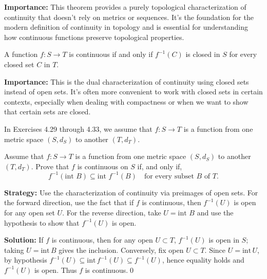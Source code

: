 \noindent\textbf{Importance:} This theorem provides a purely topological characterization of continuity that doesn't rely on metrics or sequences. It's the foundation for the modern definition of continuity in topology and is essential for understanding how continuous functions preserve topological properties.



\begin{theorem}
A function $f: S \to T$ is continuous if and only if $f^{-1}(C)$ is closed in $S$ for every closed set $C$ in $T$.
\end{theorem}

\noindent\textbf{Importance:} This is the dual characterization of continuity using closed sets instead of open sets. It's often more convenient to work with closed sets in certain contexts, especially when dealing with compactness or when we want to show that certain sets are closed.



In Exercises 4.29 through 4.33, we assume that $f:S\to T$ is a function from one metric space $(S,d_S)$ to another $(T,d_T)$.



\begin{problembox}
\begin{problemstatement}
Assume that $f : S \rightarrow T$ is a function from one metric space $(S, d_S)$ to another $(T, d_T)$. Prove that $f$ is continuous on $S$ if, and only if,
\[ f^{-1}(\text{int } B) \subseteq \text{int } f^{-1}(B) \quad \text{for every subset } B \text{ of } T. \]
\end{problemstatement}
\end{problembox}

\noindent\textbf{Strategy:} Use the characterization of continuity via preimages of open sets. For the forward direction, use the fact that if $f$ is continuous, then $f^{-1}(U)$ is open for any open set $U$. For the reverse direction, take $U = \text{int } B$ and use the hypothesis to show that $f^{-1}(U)$ is open.

\bigskip\noindent\textbf{Solution:}
If $f$ is continuous, then for any open $U\subset T$, $f^{-1}(U)$ is open in $S$; taking $U=\mathrm{int}\,B$ gives the inclusion. Conversely, fix open $U\subset T$. Since $U=\mathrm{int}\,U$, by hypothesis $f^{-1}(U)\subseteq\mathrm{int}\,f^{-1}(U)\subseteq f^{-1}(U)$, hence equality holds and $f^{-1}(U)$ is open. Thus $f$ is continuous.\qed



